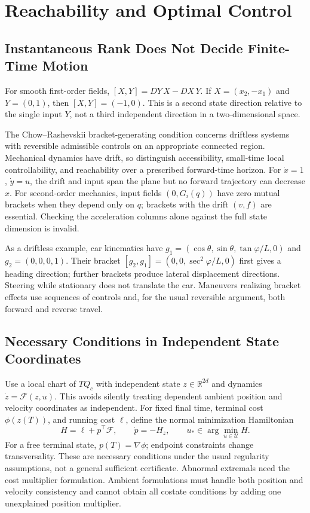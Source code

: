 \section{Reachability and Optimal Control}
\label{sec:ch9:optimal-control}

\subsection{Instantaneous Rank Does Not Decide Finite-Time Motion}

For smooth first-order fields, $[X,Y]=DY\,X-DX\,Y$. If $X=(x_2,-x_1)$ and $Y=(0,1)$, then $[X,Y]=(-1,0)$. This is a second state direction relative to the single input $Y$, not a third independent direction in a two-dimensional space.

The Chow--Rashevskii bracket-generating condition concerns driftless systems with reversible admissible controls on an appropriate connected region. Mechanical dynamics have drift, so distinguish accessibility, small-time local controllability, and reachability over a prescribed forward-time horizon. For $\dot x=1$, $\dot y=u$, the drift and input span the plane but no forward trajectory can decrease $x$. For second-order mechanics, input fields $(0,G_i(q))$ have zero mutual brackets when they depend only on $q$; brackets with the drift $(v,f)$ are essential. Checking the acceleration columns alone against the full state dimension is invalid.

As a driftless example, car kinematics have $g_1=(\cos\theta,\sin\theta,\tan\varphi/L,0)$ and $g_2=(0,0,0,1)$. Their bracket $[g_2,g_1]=(0,0,\sec^2\varphi/L,0)$ first gives a heading direction; further brackets produce lateral displacement directions. Steering while stationary does not translate the car. Maneuvers realizing bracket effects use sequences of controls and, for the usual reversible argument, both forward and reverse travel.

\subsection{Necessary Conditions in Independent State Coordinates}

Use a local chart of $TQ_c$ with independent state $z\in\mathbb R^{2d}$ and dynamics $\dot z=\mathcal F(z,u)$. This avoids silently treating dependent ambient position and velocity coordinates as independent. For fixed final time, terminal cost $\phi(z(T))$, and running cost $\ell$, define the normal minimization Hamiltonian
\begin{equation}
 H=\ell+p^\top\mathcal F,\qquad \dot p=-H_z,\qquad
 u_*\in\arg\min_{u\in\mathcal U}H.
\end{equation}
For a free terminal state, $p(T)=\nabla\phi$; endpoint constraints change transversality. These are necessary conditions under the usual regularity assumptions, not a general sufficient certificate. Abnormal extremals need the cost multiplier formulation. Ambient formulations must handle both position and velocity consistency and cannot obtain all costate conditions by adding one unexplained position multiplier.

